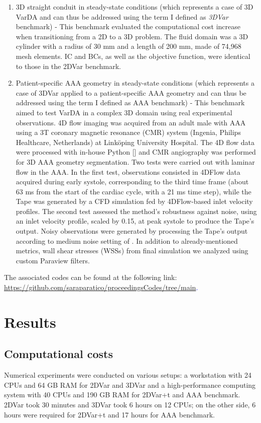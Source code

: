 \begin{enumerate}
    \item 3D straight conduit in steady-state conditions (which represents a case of 3D VarDA and can thus be addressed using the term I defined as \emph{3DVar} benchmark) - This benchmark evaluated the computational cost increase when transitioning from a 2D to a 3D problem. The fluid domain was a 3D cylinder with a radius of 30 mm and a length of 200 mm, made of 74,968 mesh elements. IC and BCs, as well as the objective function, were identical to those in the 2DVar benchmark.
    \item Patient-specific AAA geometry in steady-state conditions (which represents a case of 3DVar applied to a patient-specific AAA geometry and can thus be addressed using the term I defined as AAA benchmark) - This benchmark aimed to test VarDA in a complex 3D domain using real experimental observations. 4D flow imaging was acquired from an adult male with AAA using a 3T coronary magnetic resonance (CMR) system (Ingenia, Philips Healthcare, Netherlands) at Linköping University Hospital. The 4D flow data were processed with in-house Python [\cite{Saitta2024}] and CMR angiography was performed for 3D AAA geometry segmentation.
Two tests were carried out with laminar flow in the AAA. In the first test, observations consisted in 4DFlow data acquired during early systole, corresponding to the third time frame (about 63 ms from the start of the cardiac cycle, with a 21 ms time step), while the Tape was generated by a CFD simulation fed by 4DFlow-based inlet velocity profiles. The second test assessed the method's robustness against noise, using an inlet velocity profile, scaled by 0.15, at peak systole to produce the Tape's output. Noisy observations were generated by processing the Tape's output according to medium noise setting of \cite{Saitta2024}.
In addition to already-mentioned metrics, wall shear stresses (WSSs) from final simulation we analyzed using custom Paraview filters.
\end{enumerate}

The associated codes can be found at the following link:
\textcolor{blue}{\url{https://github.com/saraparatico/proceedingsCodes/tree/main}.}

\section*{Results}
\label{sec:Results}
\label{ch:chapter_three}

\subsection*{Computational costs}
Numerical experiments were conducted on various setups: a workstation with 24 CPUs and 64 GB RAM for 2DVar and 3DVar and a high-performance computing system with 40 CPUs and 190 GB RAM for 2DVar+t and AAA benchmark. 2DVar took 30 minutes and 3DVar took 6 hours on 12 CPUs; on the other side, 6 hours were required for 2DVar+t and 17 hours for AAA benchmark.

